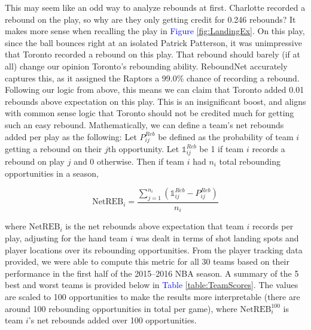 \documentclass{article}
\begin{document}
 \bigbreak
\noindent
This may seem like an odd way to analyze rebounds at first. Charlotte recorded a rebound on the play, so why are they only getting credit for 0.246 rebounds? It makes more sense when recalling the play in \textcolor{blue}{Figure} \ref{fig:LandingEx}. On this play, since the ball bounces right at an isolated Patrick Patterson, it was unimpressive that Toronto recorded a rebound on this play. That rebound should barely (if at all) change our opinion Toronto's rebounding ability. ReboundNet accurately captures this, as it assigned the Raptors a 99.0\% chance of recording a rebound. Following our logic from above, this means we can claim that Toronto added 0.01 rebounds above expectation on this play. This is an insignificant boost, and aligns with common sense logic that Toronto should not be credited much for getting such an easy rebound.
\bigbreak
\noindent
Mathematically, we can define a team's net rebounds added per play as the following: Let $P^{Reb}_{ij}$ be defined as the probability of team $i$ getting a rebound on their $j$th opportunity. Let $\mathds{1}^{Reb}_{ij}$ be 1 if team $i$ records a rebound on play $j$ and 0 otherwise. Then if team $i$ had $n_{i}$ total rebounding opportunities in a season,

$$ \text{NetREB}_{i} = \frac{\sum_{j=1}^{n_{i}}(\mathds{1}^{Reb}_{ij} - P^{Reb}_{ij})}{n_{i}} $$

\noindent
where  $\text{NetREB}_{i}$ is the net rebounds above expectation that team $i$ records per play, adjusting for the hand team $i$ was dealt in terms of shot landing spots and player locations over its rebounding opportunities.
\bigbreak
\noindent
From the player tracking data provided, we were able to compute this metric for all 30 teams based on their performance in the first half of the 2015--2016 NBA season. A summary of the 5 best and worst teams is provided below in \textcolor{blue}{Table} \ref{table:TeamScores}. The values are scaled to 100 opportunities to make the results more interpretable (there are around 100 rebounding opportunities in total per game), where $\text{NetREB}^{100}_{i}$ is team $i$'s net rebounds added over 100 opportunities.
\end{document}
